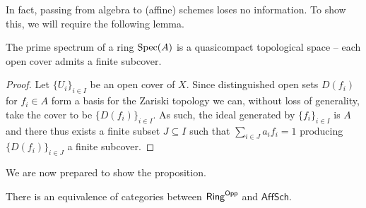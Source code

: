 In fact, passing from algebra to (affine) schemes loses no information. To show this, we will require the following lemma. 
\begin{lemma}\label{lem: affine schemes are quasicompact}
    The prime spectrum of a ring $\operatorname{Spec}(A)$ is a quasicompact topological space -- each open cover admits a finite subcover. 
\end{lemma}
\begin{proof}
    Let $\{U_{i}\}_{i\in I}$ be an open cover of $X$. Since distinguished open sets $D(f_{i})$ for $f_{i}\in A$ form a basis for the Zariski topology we can, without loss of generality, take the cover to be $\{D(f_{i})\}_{i\in I}$. As such, the ideal generated by $\{f_{i}\}_{i\in I}$ is $A$ and there thus exists a finite subset $J\subseteq I$ such that $\sum_{i\in J}a_{i}f_{i}=1$ producing $\{D(f_{i})\}_{i\in J}$ a finite subcover. 
\end{proof}
We are now prepared to show the proposition.  
\begin{proposition}\label{prop: affine schemes is antiequivalent to rings}
    There is an equivalence of categories between $\mathsf{Ring}^{\mathsf{Opp}}$ and $\mathsf{AffSch}$. 
\end{proposition}
